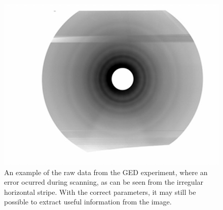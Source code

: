 \begin{figure}
\includegraphics[width=12cm]{example}
\caption{An example of the raw data from the GED experiment, where an error ocurred during scanning, as can be seen from the irregular horizontal stripe. With the correct parameters, it may still be possible to extract useful information from the image.}
\label{example} 
\end{figure} 


 